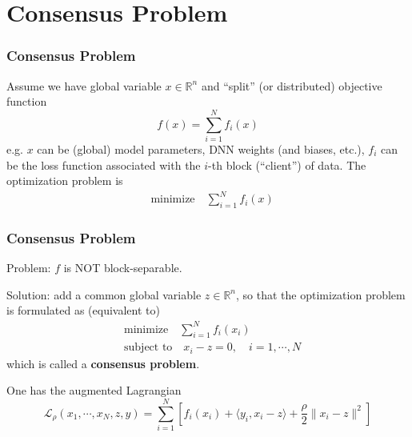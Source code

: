 
\section[Basic Consensus]{Consensus Problem}


\begin{frame}
\frametitle{Consensus Problem}

Assume we have global variable $x \in \mathbb{R}^n$ and ``split'' (or distributed) objective function
$$f(x) = \sum\limits_{i=1}^N f_i(x)$$
e.g. $x$ can be (global) model parameters, DNN weights (and biases, etc.), $f_i$ can be the loss function associated with the $i$-th block (``client'') of data. The optimization problem is
\begin{align*}
    & \text{minimize} \quad \sum\limits_{i=1}^N f_i(x)
\end{align*}
    
\end{frame}


\begin{frame}
\frametitle{Consensus Problem}

Problem: $f$ is NOT block-separable.

\pause
\vspace{0.8em}

Solution: add a common global variable $z \in \mathbb{R}^n$, so that the optimization problem is formulated as (equivalent to)
\begin{align*}
    & \text{minimize} \quad \sum\limits_{i=1}^N f_i(x_i) \\
    & \text{subject to} \quad x_i - z = 0, \quad i=1,\cdots,N
\end{align*}
which is called a {\bfseries consensus problem}.

\pause
\vspace{0.8em}

One has the augmented Lagrangian
$$\mathcal{L}_{\rho}(x_1,\cdots,x_N,z,y) = \sum\limits_{i=1}^N \left[ f_i(x_i) + \langle y_i, x_i-z \rangle + \dfrac{\rho}{2} \lVert x_i-z \rVert^2 \right]$$

\end{frame}


